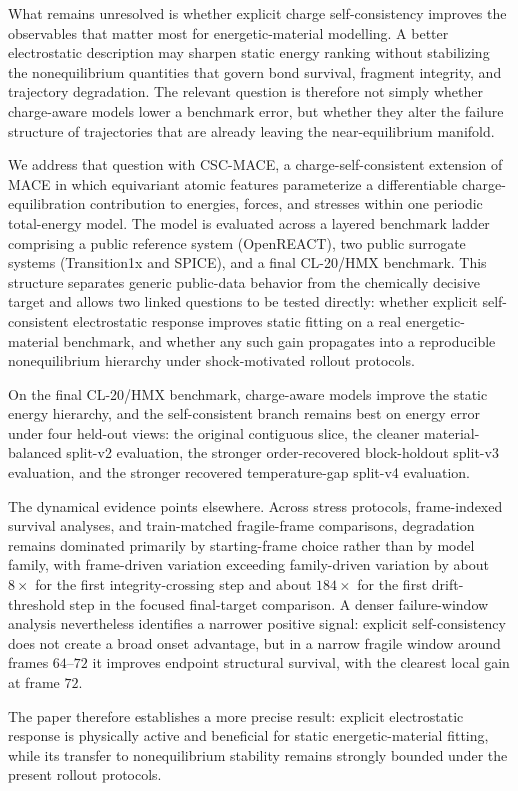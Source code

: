 What remains unresolved is whether explicit charge self-consistency improves the observables that matter most for energetic-material modelling. A better electrostatic description may sharpen static energy ranking without stabilizing the nonequilibrium quantities that govern bond survival, fragment integrity, and trajectory degradation. The relevant question is therefore not simply whether charge-aware models lower a benchmark error, but whether they alter the failure structure of trajectories that are already leaving the near-equilibrium manifold.

We address that question with CSC-MACE, a charge-self-consistent extension of MACE in which equivariant atomic features parameterize a differentiable charge-equilibration contribution to energies, forces, and stresses within one periodic total-energy model. The model is evaluated across a layered benchmark ladder comprising a public reference system (OpenREACT), two public surrogate systems (Transition1x and SPICE), and a final CL-20/HMX benchmark. This structure separates generic public-data behavior from the chemically decisive target and allows two linked questions to be tested directly: whether explicit self-consistent electrostatic response improves static fitting on a real energetic-material benchmark, and whether any such gain propagates into a reproducible nonequilibrium hierarchy under shock-motivated rollout protocols.

On the final CL-20/HMX benchmark, charge-aware models improve the static energy hierarchy, and the self-consistent branch remains best on energy error under four held-out views: the original contiguous slice, the cleaner material-balanced split-v2 evaluation, the stronger order-recovered block-holdout split-v3 evaluation, and the stronger recovered temperature-gap split-v4 evaluation.

The dynamical evidence points elsewhere. Across stress protocols, frame-indexed survival analyses, and train-matched fragile-frame comparisons, degradation remains dominated primarily by starting-frame choice rather than by model family, with frame-driven variation exceeding family-driven variation by about $8\times$ for the first integrity-crossing step and about $184\times$ for the first drift-threshold step in the focused final-target comparison. A denser failure-window analysis nevertheless identifies a narrower positive signal: explicit self-consistency does not create a broad onset advantage, but in a narrow fragile window around frames $64$--$72$ it improves endpoint structural survival, with the clearest local gain at frame $72$.

The paper therefore establishes a more precise result: explicit electrostatic response is physically active and beneficial for static energetic-material fitting, while its transfer to nonequilibrium stability remains strongly bounded under the present rollout protocols.
